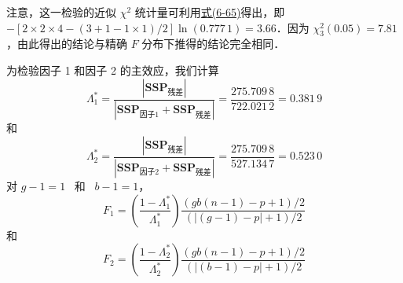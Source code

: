 注意，这一检验的近似 $\chi^2$ 统计量可利用\hyperref[eq:6-65]{式(6-65)}得出，即 $-\left[2\times2\times4-(3+1-1\times1)/2\right]\ln(0.777\,1)=3.66$．因为 $\chi_3^2(0.05)=7.81$，由此得出的结论与精确 $F$ 分布下推得的结论完全相同．

为检验因子 1 和因子 2 的主效应，我们计算
\[
\Lambda_1^*=\frac{|\mathbf{SSP}_{\text{残差}}|}{|\mathbf{SSP}_{\text{因子1}}+\mathbf{SSP}_{\text{残差}}|}=\frac{275.709\,8}{722.021\,2}=0.381\,9
\]
和
\[
\Lambda_2^*=\frac{|\mathbf{SSP}_{\text{残差}}|}{|\mathbf{SSP}_{\text{因子2}}+\mathbf{SSP}_{\text{残差}}|}=\frac{275.709\,8}{527.134\,7}=0.523\,0
\]
对 \quad $g-1=1$ \ 和 \ $b-1=1$，
\[
F_1=\left(\frac{1-\Lambda_1^*}{\Lambda_1^*}\right)\frac{(gb(n-1)-p+1)/2}{(|(g-1)-p|+1)/2}
\]
和
\[
F_2=\left(\frac{1-\Lambda_2^*}{\Lambda_2^*}\right)\frac{(gb(n-1)-p+1)/2}{(|(b-1)-p|+1)/2}
\]
